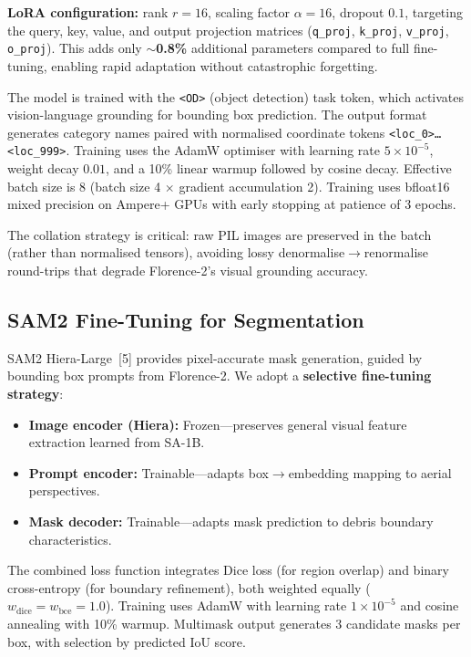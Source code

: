 \documentclass[10pt,a4paper,twocolumn]{article}
\begin{document}
\textbf{LoRA configuration:} rank $r{=}16$, scaling factor $\alpha{=}16$, dropout $0.1$, targeting the query, key, value, and output projection matrices (\texttt{q\_proj}, \texttt{k\_proj}, \texttt{v\_proj}, \texttt{o\_proj}). This adds only \textbf{$\sim$0.8\%} additional parameters compared to full fine-tuning, enabling rapid adaptation without catastrophic forgetting.

The model is trained with the \texttt{<OD>} (object detection) task token, which activates vision-language grounding for bounding box prediction. The output format generates category names paired with normalised coordinate tokens \texttt{<loc\_0>\ldots<loc\_999>}. Training uses the AdamW optimiser with learning rate $5 \times 10^{-5}$, weight decay $0.01$, and a 10\% linear warmup followed by cosine decay. Effective batch size is 8 (batch size 4 $\times$ gradient accumulation 2). Training uses bfloat16 mixed precision on Ampere+ GPUs with early stopping at patience of 3 epochs.

The collation strategy is critical: raw PIL images are preserved in the batch (rather than normalised tensors), avoiding lossy denormalise$\rightarrow$renormalise round-trips that degrade Florence-2's visual grounding accuracy.

\subsection{SAM2 Fine-Tuning for Segmentation}

SAM2 Hiera-Large~[5] provides pixel-accurate mask generation, guided by bounding box prompts from Florence-2. We adopt a \textbf{selective fine-tuning strategy}:

\begin{itemize}
  \item \textbf{Image encoder (Hiera):} Frozen---preserves general visual feature extraction learned from SA-1B.
  \item \textbf{Prompt encoder:} Trainable---adapts box$\rightarrow$embedding mapping to aerial perspectives.
  \item \textbf{Mask decoder:} Trainable---adapts mask prediction to debris boundary characteristics.
\end{itemize}

The combined loss function integrates Dice loss (for region overlap) and binary cross-entropy (for boundary refinement), both weighted equally ($w_\text{dice} = w_\text{bce} = 1.0$). Training uses AdamW with learning rate $1 \times 10^{-5}$ and cosine annealing with 10\% warmup. Multimask output generates 3 candidate masks per box, with selection by predicted IoU score.
\end{document}
